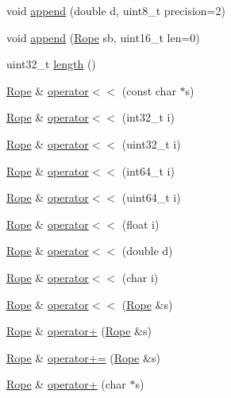 \begin{DoxyCompactItemize}
void \hyperlink{classetk_1_1_rope_aca8809e9cd6407e3fefee01ebac10d52}{append} (double d, uint8\-\_\-t precision=2)
\item 
void \hyperlink{classetk_1_1_rope_acc7a000e195f3b6d5aaa9f990a1b88b3}{append} (\hyperlink{classetk_1_1_rope}{Rope} sb, uint16\-\_\-t len=0)
\item 
uint32\-\_\-t \hyperlink{classetk_1_1_rope_a6b645eb62efa66f62e9ab19ff3257ae8}{length} ()
\item 
\hyperlink{classetk_1_1_rope}{Rope} \& \hyperlink{classetk_1_1_rope_a71bb7cbfbe2b2a3347182ca43e53f9ca}{operator$<$$<$} (const char $\ast$s)
\item 
\hyperlink{classetk_1_1_rope}{Rope} \& \hyperlink{classetk_1_1_rope_a2075d0c26e588a5ecac7491382d8729e}{operator$<$$<$} (int32\-\_\-t i)
\item 
\hyperlink{classetk_1_1_rope}{Rope} \& \hyperlink{classetk_1_1_rope_abe6ad92e1549345a9b9d74aa2bb7de5c}{operator$<$$<$} (uint32\-\_\-t i)
\item 
\hyperlink{classetk_1_1_rope}{Rope} \& \hyperlink{classetk_1_1_rope_adde3399c145353ca584720ece2cdc8d2}{operator$<$$<$} (int64\-\_\-t i)
\item 
\hyperlink{classetk_1_1_rope}{Rope} \& \hyperlink{classetk_1_1_rope_abce583a5e36385ae8f70fff167041551}{operator$<$$<$} (uint64\-\_\-t i)
\item 
\hyperlink{classetk_1_1_rope}{Rope} \& \hyperlink{classetk_1_1_rope_a3c8cfea81f56d853522be788853513ef}{operator$<$$<$} (float i)
\item 
\hyperlink{classetk_1_1_rope}{Rope} \& \hyperlink{classetk_1_1_rope_a7bf2a2c121f4da3066c94c2d531f22fd}{operator$<$$<$} (double d)
\item 
\hyperlink{classetk_1_1_rope}{Rope} \& \hyperlink{classetk_1_1_rope_ad4bb5552c0d1423644595d58862a7f20}{operator$<$$<$} (char i)
\item 
\hyperlink{classetk_1_1_rope}{Rope} \& \hyperlink{classetk_1_1_rope_a6997a083d1f42c1eaa49884fb3d8fe17}{operator$<$$<$} (\hyperlink{classetk_1_1_rope}{Rope} \&s)
\item 
\hyperlink{classetk_1_1_rope}{Rope} \& \hyperlink{classetk_1_1_rope_a1ae51d8bf0de9df47052937d4e04c1b8}{operator+} (\hyperlink{classetk_1_1_rope}{Rope} \&s)
\item 
\hyperlink{classetk_1_1_rope}{Rope} \& \hyperlink{classetk_1_1_rope_a7628496e56b89699d1784034f21ebad6}{operator+=} (\hyperlink{classetk_1_1_rope}{Rope} \&s)
\item 
\hyperlink{classetk_1_1_rope}{Rope} \& \hyperlink{classetk_1_1_rope_a02352379fa7d3fe43e7aa3f602829cf8}{operator+} (char $\ast$s)

\end{DoxyCompactItemize}
